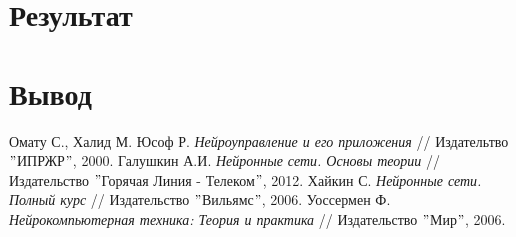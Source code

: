 \documentclass[14pt]{extreport}
\begin{document}
        \section{Результат}
        \section{Вывод}

\newpage
        \begin{thebibliography}{99}
             Омату С., Халид М. Юсоф Р. {\it Нейроуправление и его приложения} // Издательтво $"$ИПРЖР$"$, 2000.
             Галушкин А.И. {\it Нейронные сети. Основы теории} // Издательство $"$Горячая Линия - Телеком$"$, 2012.
             Хайкин С. {\it Нейронные сети. Полный курс} // Издательство $"$Вильямс$"$, 2006.
             Уоссермен Ф. {\it Нейрокомпьютерная техника: Теория и практика} // Издательство $"$Мир$"$, 2006.
        \end{thebibliography}
\end{document}
